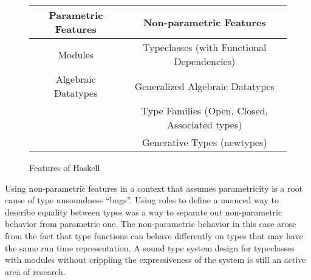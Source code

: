 \documentclass[manuscript,screen,nonacm]{acmart}
\begin{document}
\begin{figure}[ht]
 \centering
 \begin{tabular}[ht]{c | c}
 Parametric Features & Non-parametric Features \\
 \hline
 Modules & Typeclasses (with Functional Dependencies)\\
 Algebraic Datatypes & Generalized Algebraic Datatypes\\
 & Type Families (Open, Closed, Associated types)\\
 & Generative Types (newtypes)
 \end{tabular}
 \caption{Features of Haskell}
 \label{fig:haskell-lang-features}
\end{figure}

Using non-parametric features in a context that assumes parametricity is a root cause of type unsoundness ``bugs''.
Using roles to define a nuanced way to describe equality between types was a way to separate out non-parametric behavior from parametric one. The non-parametric behavior in this case arose from the fact that type functions can behave differently on types that may have the same run time representation.
A sound type system design for typeclasses with modules without crippling the expressiveness of the system is still an active area of research.


\end{document}
